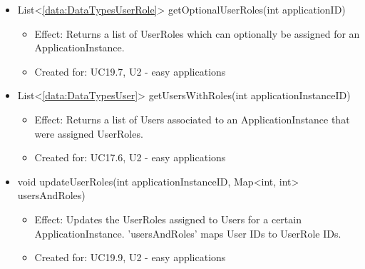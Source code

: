 \begin{description}
\begin{itemize}[noitemsep,nolistsep,leftmargin=-.25cm]
\begin{itemize}
        \end{itemize}
      \item \textsf{List\textless{}\ref{data:DataTypesUserRole}\textgreater{} getOptionalUserRoles(int applicationID)}
        \begin{itemize}[noitemsep,nolistsep]
           \item Effect: Returns a list of UserRoles which can optionally be assigned for an ApplicationInstance.
\item Created for: UC19.7, U2 - easy applications
        \end{itemize}
      \item \textsf{List\textless{}\ref{data:DataTypesUser}\textgreater{} getUsersWithRoles(int applicationInstanceID)}
        \begin{itemize}[noitemsep,nolistsep]
           \item Effect: Returns a list of Users associated to an ApplicationInstance that were assigned UserRoles.
\item Created for: UC17.6, U2 - easy applications
        \end{itemize}
      \item \textsf{void updateUserRoles(int applicationInstanceID, Map\textless{}int, int\textgreater{} usersAndRoles)}
        \begin{itemize}[noitemsep,nolistsep]
           \item Effect: Updates the UserRoles assigned to Users for a certain ApplicationInstance. 'usersAndRoles' maps User IDs to UserRole IDs.
\item Created for: UC19.9, U2 - easy applications
        \end{itemize}
    \end{itemize}
    \end{description}

